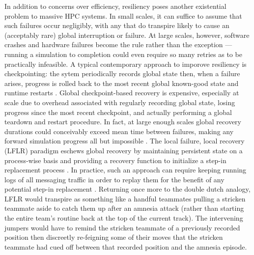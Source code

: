 In addition to concerns over efficiency, resiliency poses another existential problem to massive HPC systems.
In small scales, it can suffice to assume that such failures occur negligibly, with any that do transpire likely to cause an (acceptably rare) global interruption or failure.
At large scales, however, software crashes and hardware failures become the rule rather than the exception \citep{dongarra2014applied} --- running a simulation to completion could even require so many retries as to be practically infeasible.
A typical contemporary approach to imporove resiliency is checkpointing: the sytem periodically records global state then, when a failure arises, progress is rolled back to the most recent global known-good state and runtime restarts \citep{hursey2007design}.
Global checkpoint-based recovery is expensive, especially at scale due to overhead associated with regularly recording global state, losing progress since the most recent checkpoint, and actually performing a global teardown and restart procedure.
In fact, at large enough scales global recovery durations could conceivably exceed mean time between failures, making any forward simulation progress all but impossible \citep{dongorra2014applied}.
The local failure, local recovery (LFLR) paradigm eschews global recovery by maintaining persistent state on a process-wise basis and providing a recovery function to initialize a step-in replacement process \citep{heroux2014toward,teranishi2014toward}.
In practice, such an approach can require keeping running logs of all messaging traffic in order to replay them for the benefit of any potential step-in replacement \citep{chakravorty2004fault}.
Returning once more to the double dutch analogy, LFLR would transpire as something like a handful teammates pulling a stricken teammate aside to catch them up after an amnesia attack (rather than starting the entire team's routine back at the top of the current track).
The intervening jumpers would have to remind the stricken teammate of a previously recorded position then discreetly re-feigning some of their moves that the stricken teammate had cued off between that recorded position and the amnesia episode.

